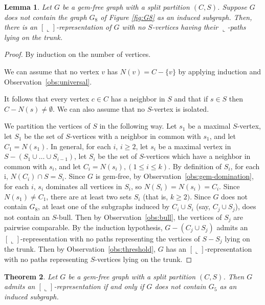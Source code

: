 \documentclass[11pt,3p,times]{elsarticle}
\newenvironment{myproof}{\begin{proof}}{\end{proof}}
\newcommand{\La}{\ensuremath{\llcorner}} \newcommand{\Lb}{\ensuremath{\ulcorner}} \newcommand{\Lc}{\ensuremath{\lrcorner}} \newcommand{\Ld}{\ensuremath{\urcorner}}
\newtheorem{theorem}{Theorem}
\newtheorem{lemma}[theorem]{Lemma}
\begin{document}
\begin{lemma}\label{lem:two-bull}
Let $G$ be a gem-free graph with a split partition $(C,S)$.
Suppose $G$ does not contain the graph $G_8$ of Figure \ref{fig:G8}
as an induced subgraph. Then,
there is an $[\La]$-representation of $G$ with no $S$-vertices
having their $\La$-paths lying on the trunk. 
\end{lemma}
\begin{myproof}
By induction on the number of vertices.

We can assume that no vertex $v$ has $N(v)=C-\{v\}$ by applying induction and
Observation~\ref{obs:universal}.

It follows that every vertex $c \in C$ has a neighbor in $S$ and that
if $s \in S$ then $C-N(s)\neq \emptyset$. We can also assume that no
$S$-vertex is isolated.


We partition the vertices of $S$ in the following way.  Let $s_1$ be a
maximal $S$-vertex, let $S_1$ be the set of $S$-vertices with a neighbor
in common with $s_1$, and let $C_1=N(s_1)$. In general, for each $i$, $i \ge 2$,
let $s_i$ be a maximal vertex in $S-(S_1 \cup \dots \cup S_{i-1})$,
let $S_i$ be the set of $S$-vertices which have a neighbor in common with $s_i$,
and let $C_i=N(s_i), (1 \le i \le k)$. By definition of $S_i$, for each i,
$N(C_i)  \cap S = S_i$. Since $G$ is gem-free, by Observation~\ref{obs:gem-domination},
for each $i$, $s_i$ dominates all vertices in $S_i$, so $N(S_i)=N(s_i) = C_i$.
Since $N(s_1) \neq C_1$, there are at least two sets $S_i$ (that is, $k \ge 2)$.
Since $G$ does not contain $G_8$, at least one of the subgraphs induced by
$C_i \cup S_i$  (say, $C_j \cup S_j$), does not contain an $S$-bull. Then by
Observation~\ref{obs:bull}, the vertices of $S_j$ are pairwise comparable.  By
the induction hypothesis, $G-(C_j \cup S_j)$ admits an $[\La]$-representation
with no paths representing the vertices of $S-S_j$ lying on the trunk.  Then
by Observation~\ref{obs:threshold}, $G$ has an $[\La]$-representation with no paths
representing $S$-vertices lying on the trunk.
\end{myproof}
\begin{theorem}\label{thm:gem-free}
Let $G$ be a gem-free graph with a split partition $(C,S)$. Then
$G$ admits an $[\La]$-representation if and only if $G$ does not contain
$G_5$ as an induced subgraph.
\end{theorem}
\end{document}
